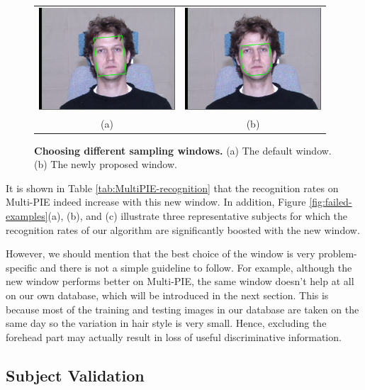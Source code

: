 \documentclass[12pt,journal,draftcls,letterpaper,onecolumn]{IEEEtran}
\begin{document}
\begin{figure}
\centering
\begin{tabular}{cc}
\includegraphics[height=1.5in]{figures_pami/example.png} &
\includegraphics[height=1.5in]{figures_pami/example_new.png}\\
(a) & (b)
\end{tabular}
\caption{{\bf Choosing different sampling windows.} (a) The default window. (b) The newly proposed window.}
\label{fig:new-mask}
\end{figure}

It is shown in Table \ref{tab:MultiPIE-recognition} that the
recognition rates on Multi-PIE indeed increase with this new
window. In addition, Figure \ref{fig:failed-examples}(a), (b),
and (c) illustrate three representative subjects for which the
recognition rates of our algorithm are significantly boosted
with the new window.

However, we should mention that the best choice of the window
is very problem-specific and there is
not a simple guideline to follow. For example, although the new
window performs better on Multi-PIE, the same window doesn't
help at all on our own database, which will be introduced in
the next section. This is because most of the training and
testing images in our database are taken on the same day so the
variation in hair style is very small. Hence, excluding the
forehead part may actually result in loss of useful
discriminative information.

\subsection{Subject Validation}
\end{document}
